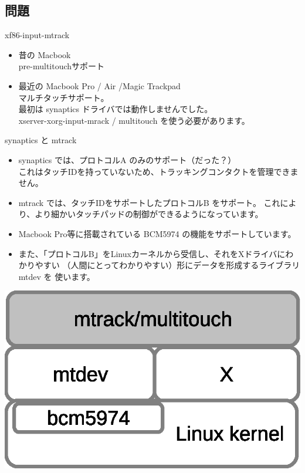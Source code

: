 \subsection{問題}



{\footnotesize
 
}


\begin{frame}{xf86-input-mtrack}

\begin{itemize}
\item 昔の Macbook \\
pre-multitouchサポート
\item 最近の Macbook Pro / Air /Magic Trackpad\\
マルチタッチサポート。\\
最初は synaptics ドライバでは動作しませんでした。\\
xserver-xorg-input-mrack / multitouch を使う必要があります。
\end{itemize}

\end{frame}


\begin{frame}{synaptics と mtrack}
\begin{itemize}
\item synaptics では、プロトコルA のみのサポート（だった？）\\
これはタッチIDを持っていないため、トラッキングコンタクトを管理できません。

\item mtrack では、タッチIDをサポートしたプロトコルB をサポート。
これにより、より細かいタッチパッドの制御ができるようになっています。

\item Macbook Pro等に搭載されている BCM5974 の機能をサポートしています。\\
\end{itemize}

\end{frame}

\begin{frame}

\begin{itemize}
\item また、「プロトコルB」をLinuxカーネルから受信し、それをXドライバにわかりやすい
（人間にとってわかりやすい）形にデータを形成するライブラリ mtdev を
使います。
\end{itemize}
\begin{center}
\includegraphics[width=0.5\hsize]{image201210/mtrack.eps}
\end{center}

\end{frame}

